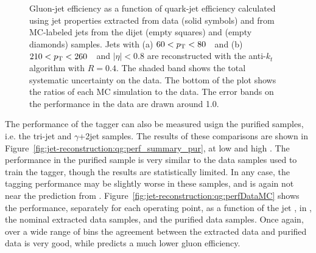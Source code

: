 \begin{figure}[!htp]
\begin{center}
\caption{ Gluon-jet efficiency as a function of quark-jet efficiency calculated using jet 
properties extracted from data (solid symbols) and from MC-labeled jets
from the dijet \Pythia (empty squares) and \Herwigpp (empty diamonds) samples. 
Jets with (a) $60<p_{\text{T}}<80$~\GeV\ and (b) $210<p_{\text{T}}<260$~\GeV\  and $|\eta|<0.8$
are reconstructed with the anti-$k_t$ algorithm with $R=0.4$.
The shaded band shows the total systematic uncertainty on the data. The bottom of the plot
shows the ratios of each MC simulation to the data. The error bands on the performance
in the data are drawn around 1.0. 
}
\label{fig:jet-reconstruction:qg:perf_summary}
\end{center}
\end{figure}

The performance of the tagger can also be measured usign the purified samples, i.e. the tri-jet and $\gamma$+2jet samples. The results of these comparisons are shown in Figure~\ref{fig:jet-reconstruction:qg:perf_summary_pur}, at low \pt and high \pt. The performance in the purified sample is very similar to the data samples used to train the tagger, though the results are statistically limited. In any case, the tagging performance may be slightly worse in these samples, and is again not near the prediction from \Pythia. Figure~\ref{fig:jet-reconstruction:qg:perfDataMC} shows the performance, separately for each operating point, as a function of the jet \pt, in \Pythia, the nominal extracted data samples, and the purified data samples. Once again, over a wide range of \pt bins the agreement between the extracted data and purified data is very good, while \Pythia predicts a much lower gluon efficiency.

